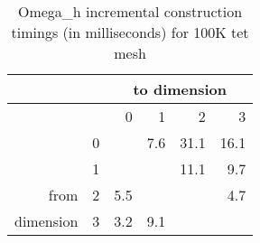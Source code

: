 \begin{table}
\caption{Omega\_h incremental construction timings (in milliseconds) for 100K tet mesh}
\label{tab:osh_adj_100}
\begin{center}
\begin{tabular}{|r|r|r r r r}
               &   & \multicolumn{4}{c}{to dimension} \\\hline
               &   &    0 &    1 &    2 &   3  \\\hline
               & 0 &      &  7.6 & 31.1 & 16.1 \\
               & 1 &      &      & 11.1 &  9.7 \\
from           & 2 &  5.5 &      &      &  4.7 \\
dimension      & 3 &  3.2 &  9.1 &      &      \\
\end{tabular}
\end{center}
\end{table}

